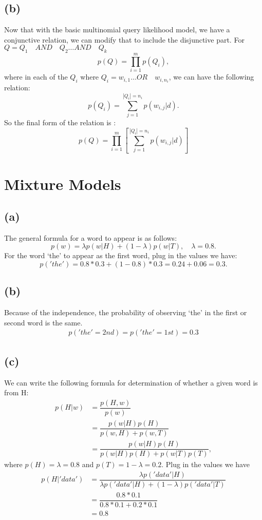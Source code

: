 \subsection*{(b)}
Now that with the basic multinomial query likelihood model, we have a conjunctive relation, we can modify that to include the disjunctive part. For $Q=Q_1 \quad AND \quad Q_2 \dots AND \quad Q_k$
\begin{equation*}
p(Q) = \prod_{i=1}^{m}p(Q_i),
\end{equation*}
where in each of the $Q_i$ where $Q_i = w_{i,1}\dots OR\quad w_{i,n_i}$, we can have the following relation:
\begin{equation*}
p(Q_i) = \sum_{j=1}^{|Q_i|=n_i} p(w_{i,j}|d).
\end{equation*}
So the final form of the relation is :
\begin{equation*}
p(Q) = \prod_{i=1}^{m} [\sum_{j=1}^{|Q_i|=n_i} p(w_{i,j}|d)]
\end{equation*}

\section{Mixture Models}
\subsection*{(a)}
The general formula for a word to appear is as follows:
\begin{equation*}
p(w) = \lambda p(w|H)+(1-\lambda)p(w|T), \quad \lambda=0.8.
\end{equation*}
For the word `the' to appear as the first word, plug in the values we have:
\begin{equation*}
p('the') = 0.8*0.3+(1-0.8)*0.3=0.24+0.06=0.3.
\end{equation*}

\subsection*{(b)}
Because of the independence, the probability of observing `the' in the first or second word is the same.
\begin{align*}
p('the'=2nd)=p('the'=1st)=0.3
\end{align*}

\subsection*{(c)}
We can write the following formula for determination of whether a given word is from H:
\begin{align*}
p(H|w) 
&= \dfrac{p(H,w)}{p(w)}  \\
&= \dfrac{p(w|H)p(H)}{p(w,H)+p(w,T)} \\
&= \dfrac{p(w|H)p(H)}{p(w|H)p(H)+p(w|T)p(T)},
\end{align*}
where $p(H)=\lambda=0.8$ and $p(T)=1-\lambda=0.2$. Plug in the values we have
\begin{align*}
p(H|'data') 
&= \dfrac{\lambda p('data'|H)}{\lambda p('data'|H)+(1-\lambda)p('data'|T)} \\
& = \dfrac{0.8*0.1}{0.8*0.1+0.2*0.1} \\
& = 0.8
\end{align*}

